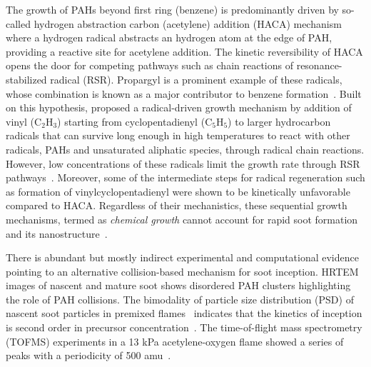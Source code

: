 The growth of PAHs beyond first ring (benzene) is predominantly driven by so-called hydrogen abstraction carbon (acetylene) addition (HACA) mechanism~\citep{frenklach2002reaction} where a hydrogen radical abstracts an hydrogen atom at the edge of PAH, providing a reactive site for acetylene addition. The kinetic reversibility of HACA opens the door for competing pathways such as chain reactions of resonance-stabilized radical (RSR). Propargyl is a prominent example of these radicals, whose combination is known as a major contributor to benzene formation~\citep{fahr1989reactions}. Built on this hypothesis, \citet{johansson2018resonance} proposed a radical-driven growth mechanism by addition of vinyl ($\mathrm{C_2H_3}$) starting from cyclopentadienyl ($\mathrm{C_5H_5}$) to larger hydrocarbon radicals that can survive long enough in high temperatures to react with other radicals, PAHs and unsaturated aliphatic species,
through radical chain reactions. However, low concentrations of these radicals limit the growth rate through RSR pathways~\citep{frenklach2020mechanism}. Moreover, some of the intermediate steps for radical regeneration such as formation of vinylcyclopentadienyl were shown to be kinetically unfavorable~\citep{frenklach2020mechanism} compared to HACA. Regardless of their mechanistics, these sequential growth mechanisms, termed as \textit{chemical growth} cannot account for rapid soot formation~\citep{frenklach2002reaction} and its nanostructure~\citep{frenklach1988comment}.

There is abundant but mostly indirect experimental and computational evidence pointing to an alternative collision-based mechanism for soot inception. HRTEM images of
nascent and mature soot shows disordered PAH clusters highlighting the role of PAH collisions. 
The bimodality of particle size distribution (PSD) of nascent soot particles in premixed flames~\citep{zhao2003measurement} indicates that the kinetics of inception is second order in precursor concentration~\citep{abid2009quantitative}. The time-of-flight mass spectrometry (TOFMS) experiments in a 13 kPa acetylene-oxygen flame showed a series of peaks with a
periodicity of 500 amu~\citep{happold2009soot}. 

